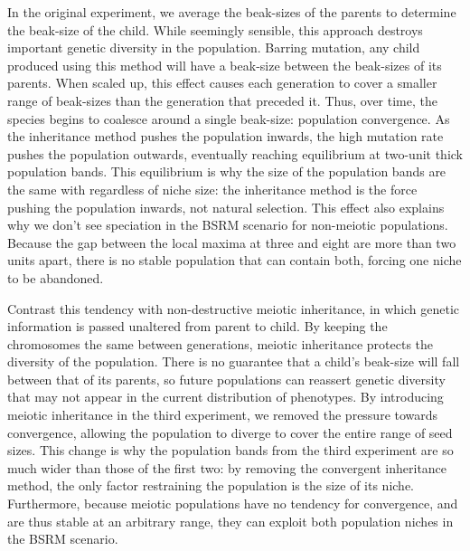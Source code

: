 \documentclass{article}
\begin{document}
In the original experiment, we average the beak-sizes of the parents to determine the beak-size of the child. While seemingly sensible, this approach destroys important genetic diversity in the population. Barring mutation, any child produced using this method will have a beak-size between the beak-sizes of its parents. When scaled up, this effect causes each generation to cover a smaller range of beak-sizes than the generation that preceded it. Thus, over time, the species begins to coalesce around a single beak-size: population convergence. As the inheritance method pushes the population inwards, the high mutation rate pushes the population outwards, eventually reaching equilibrium at two-unit thick population bands. This equilibrium is why the size of the population bands are the same with regardless of niche size: the inheritance method is the force pushing the population inwards, not natural selection. This effect also explains why we don’t see speciation in the BSRM scenario for non-meiotic populations. Because the gap between the local maxima at three and eight are more than two units apart, there is no stable population that can contain both, forcing one niche to be abandoned.

Contrast this tendency with non-destructive meiotic inheritance, in which genetic information is passed unaltered from parent to child. By keeping the chromosomes the same between generations, meiotic inheritance protects the diversity of the population. There is no guarantee that a child’s beak-size will fall between that of its parents, so future populations can reassert genetic diversity that may not appear in the current distribution of phenotypes. By introducing meiotic inheritance in the third experiment, we removed the pressure towards convergence, allowing the population to diverge to cover the entire range of seed sizes. This change is why the population bands from the third experiment are so much wider than those of the first two: by removing the convergent inheritance method, the only factor restraining the population is the size of its niche. Furthermore, because meiotic populations have no tendency for convergence, and are thus stable at an arbitrary range, they can exploit both population niches in the BSRM scenario.
\end{document}
